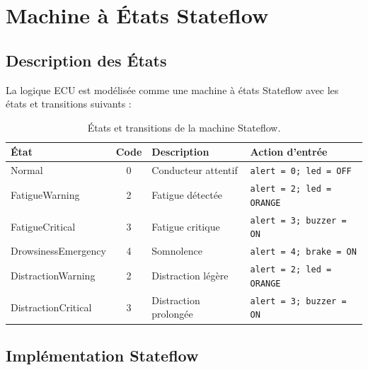 \section{Machine à États Stateflow}

\subsection{Description des États}

La logique ECU est modélisée comme une machine à états Stateflow avec les états et transitions suivants :

\begin{table}[H]
\centering
\caption{États et transitions de la machine Stateflow.}
\label{tab:stateflow_states}
\renewcommand{\arraystretch}{1.4}
\begin{tabularx}{\textwidth}{|l|c|X|X|}
\hline
\rowcolor{stellantisblue!15}
\textbf{État} & \textbf{Code} & \textbf{Description} & \textbf{Action d'entrée} \\
\hline
Normal & 0 & Conducteur attentif & \texttt{alert = 0; led = OFF} \\
\hline
\cellcolor{alertyellow!20} FatigueWarning & 2 & Fatigue détectée & \texttt{alert = 2; led = ORANGE} \\
\hline
\cellcolor{alertorange!20} FatigueCritical & 3 & Fatigue critique & \texttt{alert = 3; buzzer = ON} \\
\hline
\cellcolor{alertred!20} DrowsinessEmergency & 4 & Somnolence & \texttt{alert = 4; brake = ON} \\
\hline
\cellcolor{alertyellow!20} DistractionWarning & 2 & Distraction légère & \texttt{alert = 2; led = ORANGE} \\
\hline
\cellcolor{alertorange!20} DistractionCritical & 3 & Distraction prolongée & \texttt{alert = 3; buzzer = ON} \\
\hline
\end{tabularx}
\end{table}

\subsection{Implémentation Stateflow}

